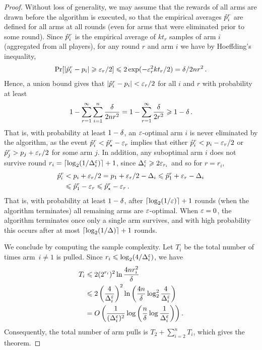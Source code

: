 \begin{proof}
Without loss of generality, we may assume that the rewards of all arms are drawn before the algorithm is executed, so that the empirical averages $\hat{p}_i^r$ are defined for all arms at all rounds (even for arms that were eliminated prior to some round).
Since $\hat{p}_i^r$ is the empirical average of $k t_r$ samples of arm $i$ (aggregated from all players),
for any round $r$ and arm $i$ we have by Hoeffding's inequality,
\begin{align*}
	\Pr[|\hat{p}_i^r - p_i| \geqslant \varepsilon_r/2]
	\leqslant 2 \exp(-\varepsilon_r^2 k t_r/2)
	= \delta / 2n r^2 \,.
\end{align*}
Hence, a union bound gives that $|\hat{p}_i^r - p_i| < \varepsilon_r/2$ for all $i$ and $r$ with probability at least
\begin{align*}
	1 - \sum_{r=1}^{\infty} \sum_{i=1}^{n} \frac{\delta}{2n r^2}
	= 1 - \sum_{r=1}^{\infty} \frac{\delta}{2 r^2}
	\geqslant 1-\delta \,.
\end{align*}
That is, with probability at least $1-\delta$, an $\varepsilon$-optimal arm $i$ is never eliminated by the algorithm, as the event $\hat{p}_i^r < \hat{p}_{\star}^r - \varepsilon_r$ implies that either $\hat{p}_i^r < p_i - \varepsilon_r/2$ or $\hat{p}_j^r > p_j + \varepsilon_r/2$ for some arm $j$.
In addition, any suboptimal arm $i$ does not survive round $r_i = \lceil\log_2(1/\Delta^{\varepsilon}_i)\rceil + 1$, since $\Delta^{\varepsilon}_i \geqslant 2 \varepsilon_{r_i}$ and so for $r = r_i$,
\begin{align*}
	\hat{p}_i^{r}
	&< p_i + \varepsilon_{r}/2 
	= p_1 + \varepsilon_{r}/2 - \Delta_i 
	\leqslant \hat{p}_1^{r} + \varepsilon_{r} - \Delta_i \\
	&\leqslant \hat{p}_1^{r} - \varepsilon_{r} 
	\leqslant \hat{p}_\star^{r} - \varepsilon_{r} \,.
\end{align*}
That is, with probability at least $1-\delta$, after $\lceil\log_2(1/\varepsilon)\rceil + 1$ rounds (when the algorithm terminates) all remaining arms are $\varepsilon$-optimal.  
When $\varepsilon=0$, the algorithm terminates once only a single arm survives, and with high probability this occurs after at most $\lceil\log_2(1/\Delta)\rceil + 1$ rounds.


We conclude by computing the sample complexity. 
Let $T_i$ be the total number of times arm~$i \ne 1$ is pulled.
Since $r_i \leqslant \log_2(4/\Delta^{\varepsilon}_i)$, we have 
\begin{align*}
	T_i 
	&\leqslant 2 (2^{r_i})^2 \ln \frac{4n r_i^2}{\delta} \\
	&\leqslant 2 \left( \frac{4}{\Delta^{\varepsilon}_i} \right)^2 
		\ln \left( \frac{4n}{\delta} \log_2^2 \frac{4}{\Delta^{\varepsilon}_i} \right) \\
	&= O\left(\frac{1}{(\Delta^{\varepsilon}_i)^2} \log \left(\frac{n}{\delta} \log \frac{1}{\Delta^{\varepsilon}_i}\right)\right) .
\end{align*}
Consequently, the total number of arm pulls is $T_2 + \sum_{i=2}^{n} T_i$, which gives the theorem.
\end{proof}





